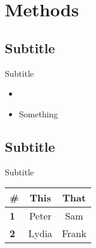 \section{Methods}
\subsection{Subtitle}
\begin{frame}{Subtitle}
\begin{center}
    \begin{itemize}
        \item \cite{relatedwork1}
        \item Something
    \end{itemize}
\end{center}
\end{frame}
%
%
\subsection{Subtitle}
\begin{frame}{Subtitle}
\begin{center}
    \begin{table}[]
        \center
        \begin{tabular}{l|c|c}
        \textbf{\#} & \textbf{This} & \textbf{That} \\ \hline
        \textbf{1}  & Peter         & Sam           \\ \hline
        \textbf{2}  & Lydia         & Frank         \\
        \end{tabular}
    \end{table}
\end{center}
\end{frame}
%
